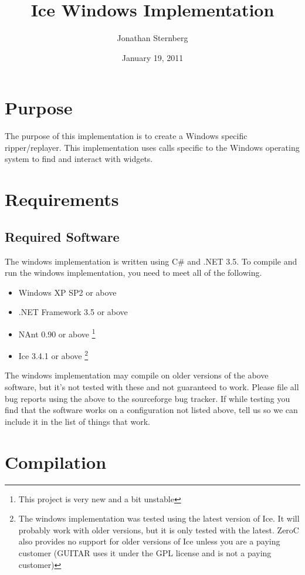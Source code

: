 \documentclass[12pt,letterpage]{article}
\title{Ice Windows Implementation}
\author{Jonathan Sternberg}
\date{January 19, 2011}
\begin{document}
\maketitle

\section{Purpose}

The purpose of this implementation is to create a Windows specific ripper/replayer. This implementation uses calls specific to the Windows operating system to find and interact with widgets.

\section{Requirements}

\subsection{Required Software}

The windows implementation is written using C\# and .NET 3.5. To compile and run the windows implementation, you need to meet all of the following.

\begin{itemize}
\item Windows XP SP2 or above
\item .NET Framework 3.5 or above
\item NAnt 0.90 or above \footnote{This project is very new and a bit unstable}
\item Ice 3.4.1 or above \footnote{The windows implementation was tested using the latest version of Ice. It will probably work with older versions, but it is only tested with the latest. ZeroC also provides no support for older versions of Ice unless you are a paying customer (GUITAR uses it under the GPL license and is not a paying customer)}
\end{itemize}

The windows implementation may compile on older versions of the above software, but it's not tested with these and not guaranteed to work. Please file all bug reports using the above to the sourceforge bug tracker. If while testing you find that the software works on a configuration not listed above, tell us so we can include it in the list of things that work.

\section{Compilation}
\end{document}
